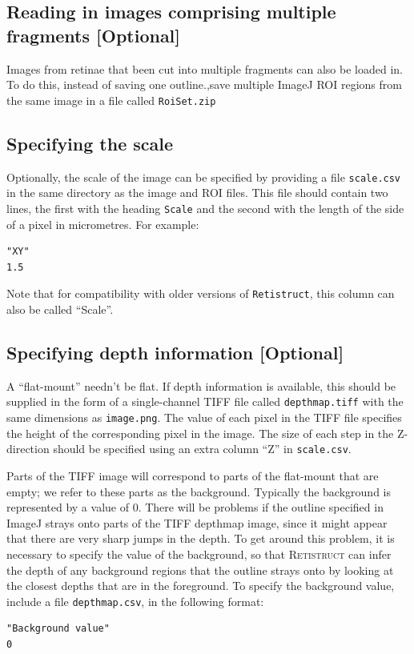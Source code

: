 \documentclass{book}
\begin{document}
\subsection{Reading in images comprising multiple fragments [Optional]}
\label{retistruct-user-guide:sec:read-imag-compr}

Images from retinae that been cut into multiple fragments can also be
loaded in. To do this, instead of saving one outline.,save multiple
ImageJ ROI regions from the same image in a file called
\texttt{RoiSet.zip}

\subsection{Specifying the scale} Optionally, the scale of the image
can be specified by providing a file \texttt{scale.csv} in the same
directory as the image and ROI files. This file should contain two
lines, the first with the heading \texttt{Scale} and the second with
the length of the side of a pixel in micrometres. For example:
\begin{verbatim}
"XY"
1.5
\end{verbatim}
Note that for compatibility with older versions of
\texttt{Retistruct}, this column can also be called ``Scale''.

\subsection{Specifying depth information [Optional]}
\label{retistruct-user-guide:sec:specifying-depth}

A ``flat-mount'' needn't be flat. If depth information is available,
this should be supplied in the form of a single-channel TIFF file
called \texttt{depthmap.tiff} with the same dimensions as
\texttt{image.png}. The value of each pixel in the TIFF file specifies
the height of the corresponding pixel in the image. The size of each
step in the Z-direction should be specified using an extra column
``Z'' in \texttt{scale.csv}.

Parts of the TIFF image will correspond to parts of the flat-mount that
are empty; we refer to these parts as the background. Typically the
background is represented by a value of 0. There will be problems if
the outline specified in ImageJ strays onto parts of the TIFF depthmap
image, since it might appear that there are very sharp jumps in the
depth. To get around this problem, it is necessary to specify the
value of the background, so that \textsc{Retistruct} can infer the
depth of any background regions that the outline strays onto by
looking at the closest depths that are in the foreground. To specify
the background value, include a file \texttt{depthmap.csv}, in the
following format:
\begin{verbatim}
"Background value"
0
\end{verbatim}
\end{document}

